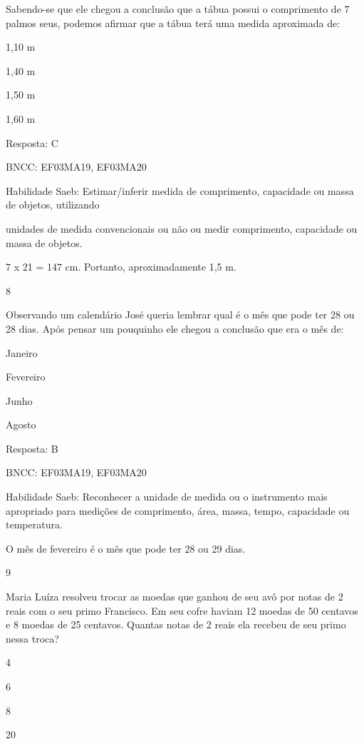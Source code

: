 \begin{escolha}
{\begin{escolha}
{Sabendo-se que ele chegou a conclusão que a tábua possui o comprimento
de 7 palmos seus, podemos afirmar que a tábua terá uma medida aproximada
de:

\begin{escolha}
\item
  1,10 m
\item
  1,40 m
\item
  1,50 m
\item
  1,60 m
\end{escolha}

Resposta: C

BNCC: EF03MA19, EF03MA20

Habilidade Saeb: Estimar/inferir medida de comprimento, capacidade ou
massa de objetos, utilizando

unidades de medida convencionais ou não ou medir comprimento, capacidade
ou massa de objetos.

7 x 21 = 147 cm. Portanto, aproximadamente 1,5 m.

\num{8}

Observando um calendário José queria lembrar qual é o mês que pode ter
28 ou 28 dias. Após pensar um pouquinho ele chegou a conclusão que era o
mês de:

\begin{escolha}
\item
  Janeiro
\item
  Fevereiro
\item
  Junho
\item
  Agosto
\end{escolha}

Resposta: B

BNCC: EF03MA19, EF03MA20

Habilidade Saeb: Reconhecer a unidade de medida ou o instrumento mais
apropriado para medições de comprimento, área, massa, tempo, capacidade
ou temperatura.

O mês de fevereiro é o mês que pode ter 28 ou 29 dias.

\num{9}

Maria Luíza resolveu trocar as moedas que ganhou de seu avô por notas de
2 reais com o seu primo Francisco. Em seu cofre haviam 12 moedas de 50
centavos e 8 moedas de 25 centavos. Quantas notas de 2 reais ela recebeu
de seu primo nessa troca?

\begin{escolha}
\item
  4
\item
  6
\item
  8
\item
  20
\end{escolha}

}
\end{escolha}}
\end{escolha}
